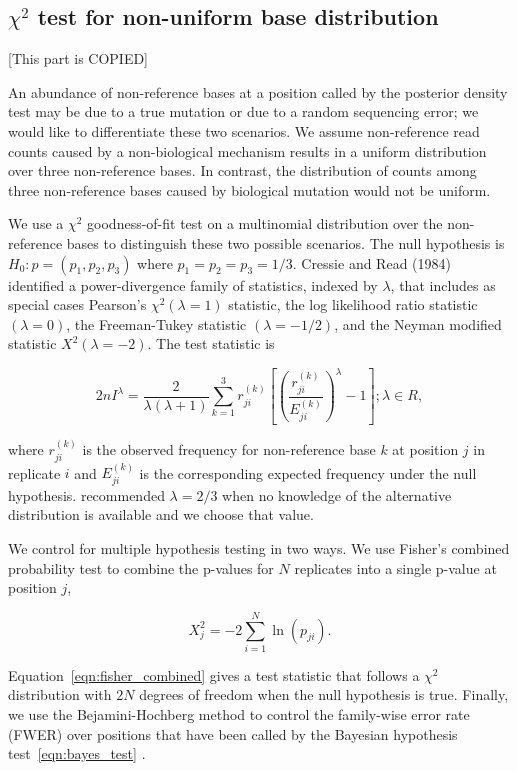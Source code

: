\documentclass[11pt,reqno]{amsart}
\begin{document}
\subsection{$\chi^2$ test for non-uniform base distribution}
[This part is COPIED]

An abundance of non-reference bases at a position called by the posterior density test may be due to a true mutation or due to a random sequencing error;
we would like to differentiate these two scenarios. We assume non-reference read counts caused by a non-biological mechanism results in a uniform distribution over three non-reference bases.
In contrast, the distribution of counts among three non-reference bases caused by biological mutation would not be uniform.

We use a $\chi^2$ goodness-of-fit test on a multinomial distribution over the non-reference bases to distinguish these two possible scenarios.
The null hypothesis is $H_0: p = (p_1, p_2, p_3)$ where $p_1=p_2=p_3=1/3$.
Cressie and Read (1984) identified a power-divergence family of statistics, indexed by $\lambda$,
that includes as special cases Pearson's $\chi^2 (\lambda = 1)$ statistic, the log likelihood ratio statistic $(\lambda = 0)$, the Freeman-Tukey statistic $(\lambda = -1/2)$, and the Neyman modified statistic $X^2 (\lambda = -2)$.
The test statistic is

\begin{equation}
 2nI^\lambda = \frac{2}{\lambda(\lambda+1)}\sum_{k=1}^3 r_{ji}^{(k)} \left[\left(\frac{r_{ji}^{(k)}}{E_{ji}^{(k)}}\right)^\lambda-1\right];\lambda \in R,
\end{equation}

where $r_{ji}^{(k)}$ is the observed frequency for non-reference base $k$ at position $j$ in replicate $i$ and $E_{ji}^{(k)}$ is the corresponding expected frequency under the null hypothesis.
 \citet{cressie1984multinomial} recommended $\lambda = 2/3$ when no knowledge of the alternative distribution is available and we choose that value.

We control for multiple hypothesis testing in two ways. We use Fisher's combined probability test \citep{fisher1970statistical} to combine the p-values for $N$ replicates into a single p-value at position $j$,

\begin{equation}\label{eqn:fisher_combined}
	X_j^2 = -2 \sum_{i=1}^N \ln(p_{ji}).
\end{equation}

Equation~\eqref{eqn:fisher_combined} gives a test statistic that follows a $\chi^2$ distribution with $2N$ degrees of freedom when the null hypothesis is true.
Finally, we use the Bejamini-Hochberg method to control the family-wise error rate (FWER) over positions that have been called by the Bayesian hypothesis test~\eqref{eqn:bayes_test} \citep{benjamini1995controlling, efron2010large}.
\end{document}
